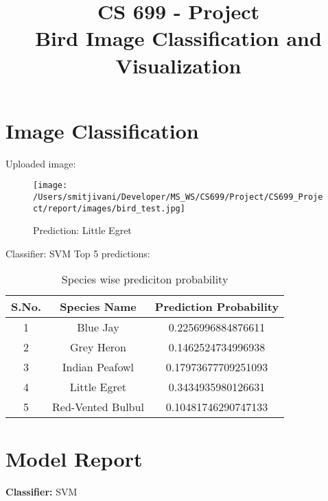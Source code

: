 \documentclass{article}
\date{}
\title{CS 699 - Project\\ Bird Image Classification and Visualization}
\begin{document}
\maketitle

\section{Image Classification}

\noindent Uploaded image:

\begin{figure}[h!]
\centering
\texttt{[image: /Users/smitjivani/Developer/MS\_WS/CS699/Project/CS699\_Project/report/images/bird\_test.jpg]}
\caption*{Prediction: Little Egret}
\label{fig:method}
\end{figure}

\noindent Classifier: SVM
\newline
\newline
\newline
\noindent Top 5 predictions:
\newline
\begin{table}[h!]
\centering
\begin{tabular}{|c|c|c|} 
\hline
 S.No. & Species Name & Prediction Probability\\ 
\hline
 1 & Blue Jay & 0.2256996884876611 \\ 
 \hline
 2 & Grey Heron & 0.1462524734996938 \\  
 \hline
 3 & Indian Peafowl & 0.17973677709251093 \\    
 \hline
 4 & Little Egret & 0.3434935980126631 \\    
 \hline
 5 & Red-Vented Bulbul & 0.10481746290747133 \\    
 \hline
\end{tabular}
\caption{Species wise prediciton probability}
\label{table:data}
\end{table}




\newpage
\section{Model Report}

\textbf{Classifier:} SVM
\newline
\end{document}
